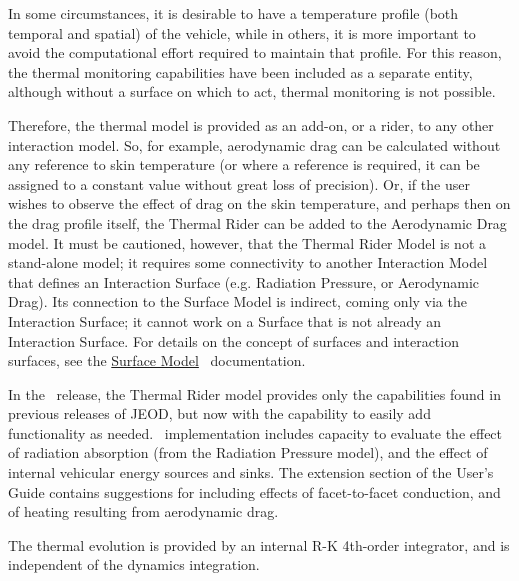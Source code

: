 %
%
% 
%



In some circumstances, it is desirable to have a temperature profile (both temporal and spatial) of the vehicle, while in others, it is more important to avoid the computational effort required to maintain that profile.  For this reason, the thermal monitoring capabilities have been included as a separate entity, although without a surface on which to act, thermal monitoring is not possible.

Therefore, the thermal model is provided as an add-on, or a rider, to any other
interaction model.  So, for example, aerodynamic drag can be calculated without
any reference to skin temperature (or where a reference is required, it can be
assigned to a constant value without great loss of precision).  Or, if the user
wishes to observe the effect of drag on the skin temperature, and perhaps then
on the drag profile itself, the Thermal Rider can be added to the Aerodynamic
Drag model.  It must be cautioned, however, that the Thermal Rider Model is not
a stand-alone model; it requires some connectivity to another Interaction Model
that defines an Interaction Surface (e.g. Radiation Pressure, or Aerodynamic
Drag).  Its connection to the Surface Model is indirect, coming only via the
Interaction Surface; it cannot work on a Surface that is not already an
Interaction Surface.  For details on the concept of surfaces and interaction
surfaces, see the
\href{file:\JEODHOME/models/utils/surface_model/docs/surface_model.pdf}{Surface
Model}~\cite{dynenv:SURFACEMODEL} documentation.

In the \JEODid\ release, the Thermal Rider model provides only the capabilities found in previous releases of JEOD, but now with the capability to easily add functionality as needed.  \JEODid\ implementation includes capacity to evaluate the effect of radiation absorption (from the Radiation Pressure model), and the effect of internal vehicular energy sources and sinks.  The extension section of the User's Guide contains suggestions for including effects of facet-to-facet conduction, and of heating resulting from aerodynamic drag.

The thermal evolution is provided by an internal R-K 4th-order integrator, and is independent of the dynamics integration.


